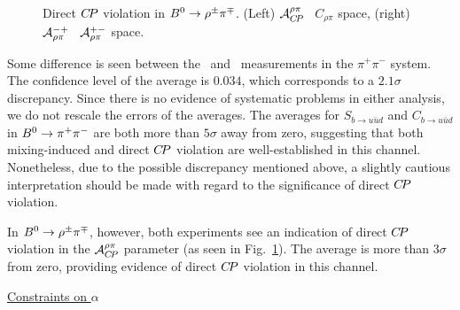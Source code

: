 \begin{figure}[htb]
\begin{center}
{    }
  \end{center}
  \vspace{-0.8cm}
  \caption{
    Direct $C\!P$ violation in $B^0\to\rho^\pm\pi^\mp$.
    (Left) ${\cal A}^{\rho\pi}_{C\!P}$ \vs\ $C_{\rho\pi}$ space,
    (right) ${\cal A}^{-+}_{\rho\pi}$ \vs\ ${\cal A}^{+-}_{\rho\pi}$ space.
  }
  \label{fig:cp_uta:uud:rhopi-dircp}
\end{figure}

Some difference is seen between the 
\babar\ and \belle\ measurements in the $\pi^+\pi^-$ system.
The confidence level of the average is $0.034$,
which corresponds to a $2.1\sigma$ discrepancy.  Since there is no
evidence of systematic problems in either analysis,
we do not rescale the errors of the averages.
The averages for $S_{b \to u\bar u d}$ and $C_{b \to u\bar u d}$ 
in $B^0 \to \pi^+\pi^-$ are both more than $5\sigma$ away from zero,
suggesting that both mixing-induced and direct $C\!P$ violation 
are well-established in this channel.
Nonetheless, due to the possible discrepancy mentioned above,
a slightly cautious interpretation should be made 
with regard to the significance of direct $C\!P$ violation.

In $B^0 \to \rho^\pm\pi^\mp$, however,
both experiments see an indication of direct $C\!P$ violation in the 
${\cal A}^{\rho\pi}_{C\!P}$ parameter 
(as seen in Fig.~\ref{fig:cp_uta:uud:rhopi-dircp}).
The average is more than $3\sigma$ from zero,
providing evidence of direct $C\!P$ violation in this channel.

\vspace{3ex}

\noindent
\underline{\large Constraints on $\alpha$}

